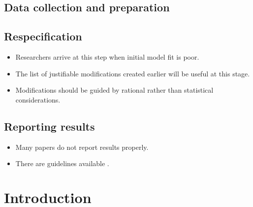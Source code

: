 \documentclass[]{book}
\providecommand{\tightlist}{%
  \setlength{\itemsep}{0pt}\setlength{\parskip}{0pt}}
\begin{document}
\hypertarget{data-collection-and-preparation}{%
\section{Data collection and preparation}\label{data-collection-and-preparation}}

\hypertarget{respecification}{%
\section{Respecification}\label{respecification}}

\begin{itemize}
\tightlist
\item
  Researchers arrive at this step when initial model fit is poor.
\item
  The list of justifiable modifications created earlier will be useful at this stage.
\item
  Modifications should be guided by rational rather than statistical considerations.
\end{itemize}

\hypertarget{reporting-results}{%
\section{Reporting results}\label{reporting-results}}

\begin{itemize}
\tightlist
\item
  Many papers do not report results properly.
\item
  There are guidelines available \citep[p 464]{Boomsma2012, Kline2016}.
\end{itemize}

\hypertarget{introduction}{%
\chapter{Introduction}\label{introduction}}
\end{document}
